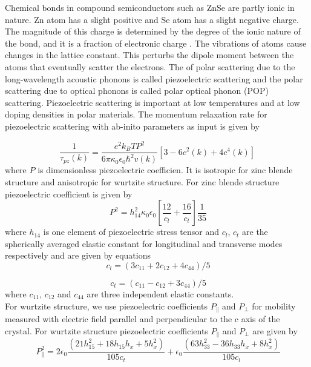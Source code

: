 \documentclass[12pt]{article}
\begin{document}
Chemical bonds in compound semiconductors such as ZnSe are partly ionic in nature. Zn atom has a slight positive and Se atom has a slight negative charge. The magnitude of this charge is determined by the degree of the ionic nature of the bond, and it is a fraction of electronic charge \cite{ridley2013quantum}. The vibrations of atoms cause changes in the lattice constant. This perturbs the dipole moment between the atoms that eventually scatter the electrons. The of polar scattering due to the long-wavelength acoustic phonons is called piezoelectric scattering and the polar scattering due to optical phonons is called polar optical phonon (POP) scattering. Piezoelectric scattering is important at low temperatures and at low doping densities in polar materials. The momentum relaxation rate for piezoelectric scattering with ab-inito parameters as input is given by \cite{rode1}

\begin{equation}
\frac{1}{\tau_{pz}(k)} = \frac{e^2 k_B T P^2 }{6\pi \kappa_0 \epsilon_0\hbar^2 v(k)}[3 - 6c^2(k)+4c^4(k)] 
\label{pz}
\end{equation}
where $P$ is dimensionless piezoelectric coefficien. It is isotropic for zinc blende structure and anisotropic for wurtzite structure. For zinc blende structure piezoelectric coefficient is given by \cite{rode1}
\begin{equation}
\ P^2 = h_{14}^2 \kappa_0 \epsilon_0 \left[ \frac{12}{c_l} + \frac{16}{c_t}\right] \frac{1}{35} 
\label{pzcoeff}
\end{equation}
where $h_{14}$ is one element of piezoelectric stress tensor and  $c_l$, $c_t$ are the spherically averaged elastic constant for longitudinal and transverse modes respectively and are given by \cite{rode3} equations
\begin{equation}
\ c_l = (3c_{11} + 2c_{12} + 4c_{44})/5 
\label{cl}
\end{equation}

\begin{equation}
\ c_t = (c_{11} - c_{12} + 3c_{44})/5 
\label{ct}
\end{equation}
where $c_{11}$, $c_{12}$ and $c_{44}$ are three independent elastic constants. \\
For wurtzite structure, we use piezoelectric coefficients $P_\parallel$ and $P_\perp$ for mobility measured with electric field parallel and perpendicular to the c axis of the crystal. For wurtzite structure piezoelectric coefficients $P_\parallel$ and $P_\perp$ are given by \cite{rode1,rode3}
\begin{equation}
\ P_{\parallel}^2 = 2 \epsilon_0 \frac{(21 h_{15}^2 + 18 h_{15} h_{x } + 5 h_x^2)}{105c_t} + \epsilon_0 \frac{(63 h_{33}^2 - 36 h_{33} h_x + 8 h_x^2)}{105c_l}  
\label{pzcoeff_para}
\end{equation}
\end{document}
